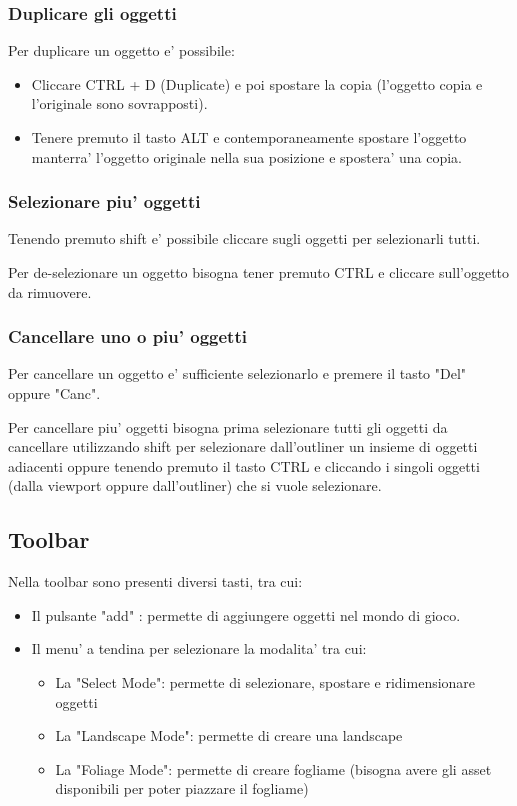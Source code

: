             \subsubsection{Duplicare gli oggetti}

                Per duplicare un oggetto e' possibile:
                \begin{itemize}
                    \item Cliccare CTRL + D (Duplicate) e poi spostare la copia (l'oggetto copia e l'originale sono sovrapposti).
                    \item Tenere premuto il tasto ALT e contemporaneamente spostare l'oggetto manterra' l'oggetto originale nella sua posizione e spostera' una copia.
                \end{itemize}

            \subsubsection{Selezionare piu' oggetti}
                Tenendo premuto shift e' possibile cliccare sugli oggetti per selezionarli tutti.

                Per de-selezionare un oggetto bisogna tener premuto CTRL e cliccare sull'oggetto da rimuovere.

            \subsubsection{Cancellare uno o piu' oggetti}
                Per cancellare un oggetto e' sufficiente selezionarlo e premere il tasto "Del" oppure "Canc".

                Per cancellare piu' oggetti bisogna prima selezionare tutti gli oggetti da cancellare utilizzando shift per selezionare dall'outliner un insieme di oggetti adiacenti oppure tenendo premuto il tasto CTRL e cliccando i singoli oggetti (dalla viewport oppure dall'outliner) che si vuole selezionare.

        \subsection{Toolbar}
            Nella toolbar sono presenti diversi tasti, tra cui:
            \begin{itemize}
                \item Il pulsante "add" \UEQuickAddIcon: permette di aggiungere oggetti nel mondo di gioco.
                \item Il menu' a tendina per selezionare la modalita' tra cui:
                    \begin{itemize}
                        \item La "Select Mode": permette di selezionare, spostare e ridimensionare oggetti
                        \item La "Landscape Mode": permette di creare una landscape
                        \item La "Foliage Mode": permette di creare fogliame (bisogna avere gli asset disponibili per poter piazzare il fogliame)
                    \end{itemize}
            \end{itemize}

